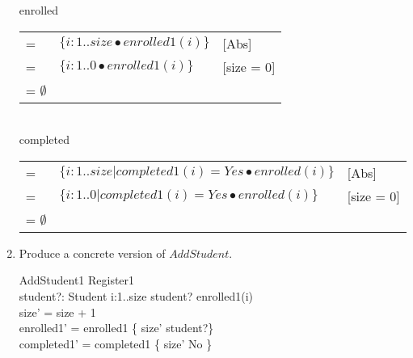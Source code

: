 \documentclass{article}
\begin{document}
\begin{enumerate}
enrolled \\
\begin{tabular}{lll}
=     & $\{i:1..size \bullet enrolled1(i)\}$   & [Abs] \\ 
=     & $\{i:1..0 \bullet enrolled1(i)\}$   & [size = 0] \\
= $\emptyset$ &  & \\
\end{tabular}
\\
completed \\
\begin{tabular}{lll}
=     & $\{i:1..size | completed1(i) = Yes \bullet enrolled(i) \}$   & [Abs] \\ 
=     & $\{i:1..0  | completed1(i) = Yes \bullet enrolled(i) \}$ & [size = 0] \\
= $\emptyset$ &  & \\
\end{tabular}
\color{black}

\item Produce a concrete version of $AddStudent$. \\
  \color{blue}
  \begin{schema}{AddStudent1}
    \Delta Register1 \\
    student?: Student
    \where
    \forall i:1..size \bullet student? \neq enrolled1(i) \\
    size' = size + 1 \\
    enrolled1' = enrolled1 \oplus \{ size' \mapsto student?\} \\
    completed1' = completed1 \oplus \{ size' \mapsto No \} \\
  \end{schema}
  \color{black}


\end{enumerate}
\end{document}
